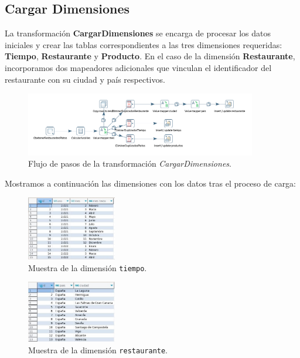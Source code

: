 \documentclass[11pt]{opticajnl}
\begin{document}
\subsection{Cargar Dimensiones}

La transformación \textbf{CargarDimensiones} se encarga de procesar los datos iniciales y crear las tablas correspondientes a las tres dimensiones requeridas: \textbf{Tiempo}, \textbf{Restaurante} y \textbf{Producto}. En el caso de la dimensión \textbf{Restaurante}, incorporamos dos mapeadores adicionales que vinculan el identificador del restaurante con su ciudad y país respectivos. \\

\begin{figure}[h]
    \centering
    \includegraphics[width=0.9\textwidth]{fotos/CargarDimensiones.png}
    \caption{Flujo de pasos de la transformación \textit{CargarDimensiones}.}
    \label{fig:etl_cargardimensiones}
\end{figure}

\noindent Mostramos a continuación las dimensiones con los datos tras el proceso de carga:

\begin{figure}[H]
    \centering
    \includegraphics[width=0.35\textwidth]{fotos/dim_tiempo.jpg}
    \caption{Muestra de la dimensión \texttt{tiempo}.}
    \label{fig:dim1}
\end{figure}

\begin{figure}[H]
    \centering
    \includegraphics[width=0.35\textwidth]{fotos/dim_restaurante.jpg}
    \caption{Muestra de la dimensión \texttt{restaurante}.}
    \label{fig:dim2}
\end{figure}
\end{document}
